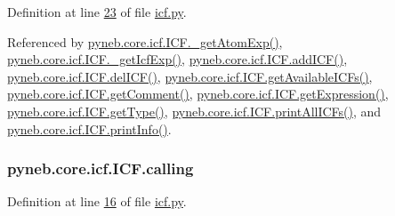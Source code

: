 Definition at line \hyperlink{icf_8py_source_l00023}{23} of file \hyperlink{icf_8py_source}{icf.\+py}.



Referenced by \hyperlink{icf_8py_source_l00730}{pyneb.\+core.\+icf.\+I\+C\+F.\+\_\+get\+Atom\+Exp()}, \hyperlink{icf_8py_source_l00738}{pyneb.\+core.\+icf.\+I\+C\+F.\+\_\+get\+Icf\+Exp()}, \hyperlink{icf_8py_source_l00797}{pyneb.\+core.\+icf.\+I\+C\+F.\+add\+I\+C\+F()}, \hyperlink{icf_8py_source_l00838}{pyneb.\+core.\+icf.\+I\+C\+F.\+del\+I\+C\+F()}, \hyperlink{icf_8py_source_l00746}{pyneb.\+core.\+icf.\+I\+C\+F.\+get\+Available\+I\+C\+Fs()}, \hyperlink{icf_8py_source_l00943}{pyneb.\+core.\+icf.\+I\+C\+F.\+get\+Comment()}, \hyperlink{icf_8py_source_l00914}{pyneb.\+core.\+icf.\+I\+C\+F.\+get\+Expression()}, \hyperlink{icf_8py_source_l00932}{pyneb.\+core.\+icf.\+I\+C\+F.\+get\+Type()}, \hyperlink{icf_8py_source_l00780}{pyneb.\+core.\+icf.\+I\+C\+F.\+print\+All\+I\+C\+Fs()}, and \hyperlink{icf_8py_source_l00853}{pyneb.\+core.\+icf.\+I\+C\+F.\+print\+Info()}.

\hypertarget{classpyneb_1_1core_1_1icf_1_1_i_c_f_aaeb9b3827ef557a32b109baef31da77f}{}
\subsubsection[{calling}]{\setlength{\rightskip}{0pt plus 5cm}pyneb.\+core.\+icf.\+I\+C\+F.\+calling}\label{classpyneb_1_1core_1_1icf_1_1_i_c_f_aaeb9b3827ef557a32b109baef31da77f}


Definition at line \hyperlink{icf_8py_source_l00016}{16} of file \hyperlink{icf_8py_source}{icf.\+py}.



